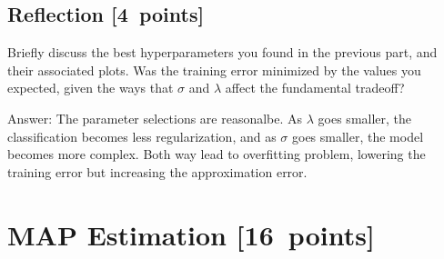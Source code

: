 \documentclass{article}
\newcommand{\blu}[1]{{\textcolor{blu}{#1}}}
\newenvironment{answer}{\par\begingroup\color{gre}Answer: }{\endgroup}
\let\ask\blu
\newcommand\pts[1]{\textcolor{pointscolour}{[#1~points]}}
\begin{document}
\subsection{Reflection \pts{4}}
\ask{
Briefly discuss the best hyperparameters you found in the previous part, and their associated plots. Was the training error minimized by the values you expected, given the ways that $\sigma$ and $\lambda$ affect the fundamental tradeoff?
}
\begin{answer}
	The parameter selections are reasonalbe. As $\lambda$ goes smaller, the classification becomes less regularization, and as $\sigma$ goes smaller, the model becomes more complex. Both way lead to overfitting problem, lowering the training error but increasing the approximation error.
\end{answer}


\clearpage
\section{MAP Estimation \pts{16}}
\end{document}
